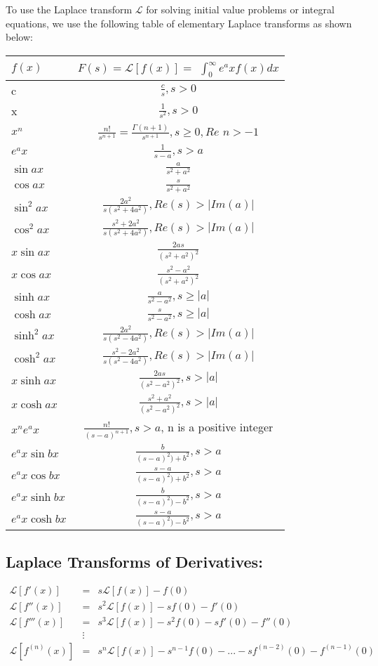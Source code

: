 \documentclass[11pt]{report}
\newcommand{\Laplace}{\mathcal{L}}
\newcommand{\sps}{\\[0.2cm]}
\newcommand{\dsp}{\displaystyle}
\newcommand{\NI}{\noindent}
\begin{document}
	\NI To use the Laplace transform $\Laplace$ for solving initial value problems or integral equations, we use the following table of elementary Laplace transforms as shown below:\\
	\begin{longtable}{| l | c | } \hline 
		$f(x)$ & $F(s) = \mathcal{L}[f(x)] =$ \(\int_{0}^{\infty} e^ax f(x) dx\)\sps
		\hline
		c & $\dsp\frac{c}{s}, s > 0$\sps
		x & $\dsp\frac{1}{s^2}, s > 0$\sps
		$x^n$ & $\dsp\frac{n!}{s^{n +1}} = \frac{\Gamma (n + 1)}{s^{n + 1}}, s \geq 0, Re$ $n > -1$\sps
		$e^ax$ & $\dsp\frac{1}{s - a}, s > a$\sps
		$\sin ax$ & $\dsp\frac{a}{s^2 + a^2}$\sps
		$\cos ax$ & $\dsp\frac{s}{s^2 + a^2}$\sps 
		$\sin^2 ax$ & $\dsp\frac{2a^2}{s(s^2 + 4 a^2)}, Re(s) > |Im(a)|$\\ 
		$\cos^2 ax$ & $\dsp\frac{s^2 + 2a^2}{s(s^2 + 4 a^2)}, Re(s) > |Im(a)|$\\ 
		$x\sin ax$ & $\dsp\frac{2as}{(s^2 + a^2)^2}$\sps 
		$x\cos ax$ & $\dsp\frac{s^2 - a^2}{(s^2 + a^2)^2}$\sps 
		$\sinh ax$ & $\dsp\frac{a}{s^2 - a^2}, s \geq |a|$\sps
		$\cosh ax$ & $\dsp\frac{s}{s^2 - a^2}, s \geq |a|$\sps 
		$\sinh^2 ax$ & $\dsp\frac{2a^2}{s(s^2 - 4 a^2)}, Re(s) > |Im(a)|$\sps
		$\cosh^2 ax$ & $\dsp\frac{s^2 - 2a^2}{s(s^2 - 4 a^2)}, Re(s) > |Im(a)|$\sps
		$x\sinh ax$ & $\dsp\frac{2as}{(s^2 - a^2)^2}, s > |a|$\sps
		$x\cosh ax$ & $\dsp\frac{s^2 + a^2}{(s^2 - a^2)^2}, s > |a|$\sps 
		$x^n e^ax$ & $\dsp\frac{n!}{(s - a)^{n + 1}}, s > a$, n is a positive integer\sps
		$e^ax \sin bx$ & $\dsp\frac{b}{(s - a)^2) + b^2}, s > a$\sps
		$e^ax \cos bx$ & $\dsp\frac{s - a}{(s - a)^2) + b^2}, s > a$\sps
		$e^ax \sinh bx$ & $\frac{b}{(s - a)^2) - b^2}, s > a$\sps
		$e^ax \cosh bx$ & $\frac{s - a}{(s - a)^2) - b^2}, s > a$\sps 
		\hline
	\end{longtable}

	\subsection{Laplace Transforms of Derivatives:}
	\begin{eqnarray*}
		\mathcal{L}[f'(x)] &=& s \mathcal{L}[f(x)] - f(0)\sps
		\mathcal{L}[f''(x)] &=& s^2 \mathcal{L}[f(x)] - sf(0) - f'(0)\sps
		\mathcal{L}[f'''(x)] &=& s^3 \mathcal{L}[f(x)] - s^2f(0) - sf'(0) - f''(0)\sps
		&\vdots\sps
		\mathcal{L}[f^{(n)} (x)] &=& s^n \mathcal{L}[f(x)] - s^{n - 1} f(0) -... - sf^{(n - 2)}(0) - f^{(n - 1)}(0)
	\end{eqnarray*}
\end{document}
